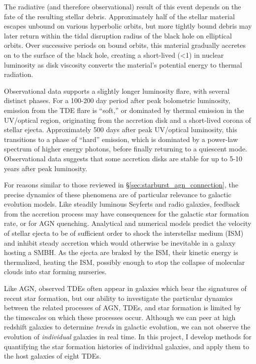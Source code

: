 \documentclass[a4paper,11pt]{article}
\begin{document}
The radiative (and therefore observational) result of this event depends on the fate of the resulting stellar debris. Approximately half of the stellar material escapes unbound on various hyperbolic orbits, but more tightly bound debris may later return within the tidal disruption radius of the black hole on elliptical orbits.\cite{Rees_1988} Over successive periods on bound orbits, this material gradually accretes on to the surface of the black hole, creating a short-lived (\textless\SI{1}{\year}) in nuclear luminosity as disk viscosity converts the material's potential energy to thermal radiation.\cite{Evans_1989}

Observational data supports a slightly longer luminosity flare, with several distinct phases. For a 100-200 day period after peak bolometric luminosity, emission from the TDE flare is ``soft,'' or dominated by thermal emission in the UV/optical region, originating from the accretion disk and a short-lived corona of stellar ejecta. Approximately 500 days after peak UV/optical luminosity, this transitions to a phase of ``hard'' emission, which is dominated by a power-law spectrum of higher energy photons, before finally returning to a quiescent mode.\cite{Wevers_2021} Observational data suggests that some accretion disks are stable for up to 5-10 years after peak luminosity.\cite{van_Velzen_2019}

For reasons similar to those reviewed in \S\ref{sec:starburst_agn_connection}, the precise dynamics of these phenomena are of particular relevance to galactic evolution models. Like steadily luminous Seyferts and radio galaxies, feedback from the accretion process may have consequences for the galactic star formation rate, or for AGN quenching. Analytical and numerical models predict the velocity of stellar ejecta to be of sufficient order to shock the interstellar medium (ISM) and inhibit steady accretion which would otherwise be inevitable in a galaxy hosting a SMBH.\cite{Evans_1989} As the ejecta are braked by the ISM, their kinetic energy is thermalized, heating the ISM, possibly enough to stop the collapse of molecular  clouds into star forming nurseries.\cite{Rees_1988}

Like AGN, observed TDEs often appear in galaxies which bear the signatures of recent star formation, but our ability to investigate the particular dynamics between the related processes of AGN, TDEs, and star formation is limited by the timescales on which these processes occur. Although we can peer at high redshift galaxies to determine \textit{trends} in galactic evolution, we can not observe the evolution of \textit{individual} galaxies in real time. In this project, I develop methods for quantifying the star formation histories of individual galaxies, and apply them to the host galaxies of eight TDEs.
\end{document}
